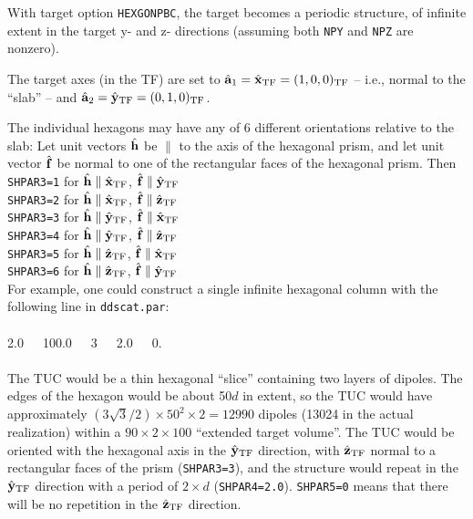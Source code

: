 	With target option {\tt HEXGONPBC}, the target
	becomes a periodic structure, of infinite extent in the target
	y- and z- directions (assuming both {\tt NPY} and {\tt NPZ} are
	nonzero).

	The target axes (in the TF) 
	are set to ${\hat{\bf a}}_1 = \hat{\bf x}_{\rm TF} = (1,0,0)_{\rm TF}$ --
	i.e., normal to the ``slab'' -- and
	${\hat{\bf a}}_2 = \hat{\bf y}_{\rm TF} = (0,1,0)_{\rm TF}$.

	The individual
	hexagons may have any of 6 different orientations relative to the
	slab: 
	Let unit vectors $\hat{\bf h}$ be $\parallel$ to the axis of the 
	hexagonal prism, and 
	let unit vector $\hat{\bf f}$ be normal to one of the rectangular
	faces of the hexagonal prism.
	Then\\
	{\tt SHPAR3=1} for $\hat{\bf h}\parallel \hat{\bf x}_{\rm TF}$,
	                  $\hat{\bf f}\parallel \hat{\bf y}_{\rm TF}$\\
	{\tt SHPAR3=2} for $\hat{\bf h}\parallel \hat{\bf x}_{\rm TF}$,
	                  $\hat{\bf f}\parallel \hat{\bf z}_{\rm TF}$\\
	{\tt SHPAR3=3} for $\hat{\bf h}\parallel \hat{\bf y}_{\rm TF}$,
	                  $\hat{\bf f}\parallel \hat{\bf x}_{\rm TF}$\\
	{\tt SHPAR3=4} for $\hat{\bf h}\parallel \hat{\bf y}_{\rm TF}$,
	                  $\hat{\bf f}\parallel \hat{\bf z}_{\rm TF}$\\
	{\tt SHPAR3=5} for $\hat{\bf h}\parallel \hat{\bf z}_{\rm TF}$,
	                  $\hat{\bf f}\parallel \hat{\bf x}_{\rm TF}$\\
	{\tt SHPAR3=6} for $\hat{\bf h}\parallel \hat{\bf z}_{\rm TF}$,
	                  $\hat{\bf f}\parallel \hat{\bf y}_{\rm TF}$\\

	For example, one could construct a single infinite hexagonal column
	with the following line in {\tt ddscat.par}:\\
	\ \\
	2.0\ \ \ 100.0\ \ \  3\ \ \  2.0\ \ \  0.\\
	\ \\
	The TUC would be a thin hexagonal ``slice'' containing two layers
	of dipoles.  The edges of the hexagon would be about 50$d$ in
	extent, so the TUC would have approximately 
	$(3\sqrt{3}/2)\times50^2\times2=
	12990$ dipoles (13024 in the actual realization)
	within a $90\times2\times100$ ``extended target volume''.
	The TUC would be oriented with the hexagonal axis in the 
	$\hat{\bf y}_{\rm TF}$ 
	direction, with $\hat{\bf z}_{\rm TF}$ normal to a rectangular
	faces of the prism
	({\tt SHPAR3=3}), and the structure would repeat in the 
	$\hat{\bf y}_{\rm TF}$ direction
	with a period of $2\times d$ ({\tt SHPAR4=2.0}).
	{\tt SHPAR5=0} means that there will be no repetition in the 
	$\hat{\bf z}_{\rm TF}$
	direction.
	
